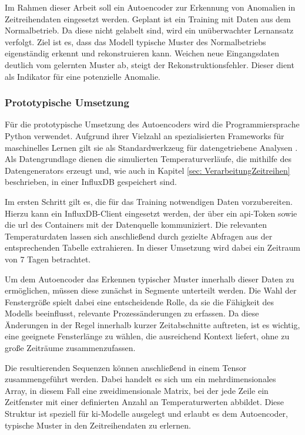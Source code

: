 Im Rahmen dieser Arbeit soll ein Autoencoder zur Erkennung von Anomalien in Zeitreihendaten eingesetzt werden. 
Geplant ist ein Training mit Daten aus dem Normalbetrieb. 
Da diese nicht gelabelt sind, wird ein unüberwachter Lernansatz verfolgt. 
Ziel ist es, dass das Modell typische Muster des Normalbetriebs eigenständig erkennt und rekonstruieren kann. 
Weichen neue Eingangsdaten deutlich vom gelernten Muster ab, steigt der Rekonstruktionsfehler.
Dieser dient als Indikator für eine potenzielle Anomalie.

\subsubsection{Prototypische Umsetzung}
Für die prototypische Umsetzung des Autoencoders wird die Programmiersprache Python verwendet. 
Aufgrund ihrer Vielzahl an spezialisierten Frameworks für maschinelles Lernen gilt sie als Standardwerkzeug für datengetriebene Analysen \cite{Python}.
Als Datengrundlage dienen die simulierten Temperaturverläufe, die mithilfe des Datengenerators erzeugt und, wie auch in Kapitel \ref{sec: VerarbeitungZeitreihen} beschrieben, in einer InfluxDB gespeichert sind.

Im ersten Schritt gilt es, die für das Training notwendigen Daten vorzubereiten. 
Hierzu kann ein InfluxDB-Client eingesetzt werden, der über ein \acs{api}-Token sowie die \acs{url} des Containers mit der Datenquelle kommuniziert.
Die relevanten Temperaturdaten lassen sich anschließend durch gezielte Abfragen aus der entsprechenden Tabelle extrahieren.
In dieser Umsetzung wird dabei ein Zeitraum von 7 Tagen betrachtet.

Um dem Autoencoder das Erkennen typischer Muster innerhalb dieser Daten zu ermöglichen, müssen diese zunächst in Segmente unterteilt werden.
Die Wahl der Fenstergröße spielt dabei eine entscheidende Rolle, da sie die Fähigkeit des Modells beeinflusst, relevante Prozessänderungen zu erfassen.
Da diese Änderungen in der Regel innerhalb kurzer Zeitabschnitte auftreten, ist es wichtig, eine geeignete Fensterlänge zu wählen, die ausreichend Kontext liefert, ohne zu große Zeiträume zusammenzufassen.



Die resultierenden Sequenzen können anschließend in einem Tensor zusammengeführt werden. 
Dabei handelt es sich um ein mehrdimensionales Array, in diesem Fall eine zweidimensionale Matrix, bei der jede Zeile ein Zeitfenster mit einer definierten Anzahl an Temperaturwerten abbildet. 
Diese Struktur ist speziell für \acs{ki}-Modelle ausgelegt und erlaubt es dem Autoencoder, typische Muster in den Zeitreihendaten zu erlernen.


